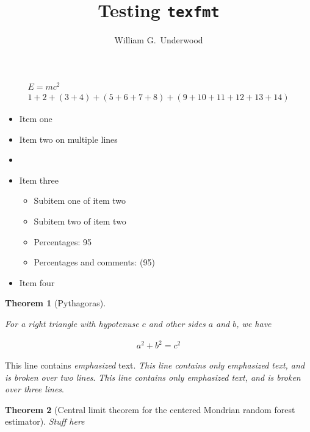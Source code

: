 \documentclass{article}
\title{Testing \texttt{texfmt}}
\author{William G.\ Underwood}
\newtheorem{theorem}{Theorem}
\begin{document}
\maketitle

\begin{align}
  E = m c^2 \\
  1 + 2
  + (3 + 4)
  + (5 + 6
  + 7 + 8)
  + (9 + 10
    + 11 + 12
  + 13 + 14)
\end{align}

\begin{itemize}
  \item Item one
  \item Item two on
    multiple lines
  \item
  \item Item three
    \begin{itemize}
      \item Subitem one of item two
      \item Subitem two of item two
      \item Percentages: 95
      \item Percentages and comments: (95)
    \end{itemize}
  \item Item four
\end{itemize}

\begin{theorem}[Pythagoras]
  \label{thm:pythagoras}

  For a right triangle with hypotenuse $c$ and other sides $a$ and $b$,
  we have

  \begin{align*}
    a^2 + b^2 = c^2
  \end{align*}

\end{theorem}

This line contains \emph{emphasized} text.
\emph{This line contains only emphasized text,
and is broken over two lines}.
\emph{This line contains only
  emphasized text,
and is broken over three lines}.

\begin{theorem}[Central limit theorem for the centered
  Mondrian random forest estimator]
  \label{thm:clt}
  Stuff here
\end{theorem}
\end{document}
